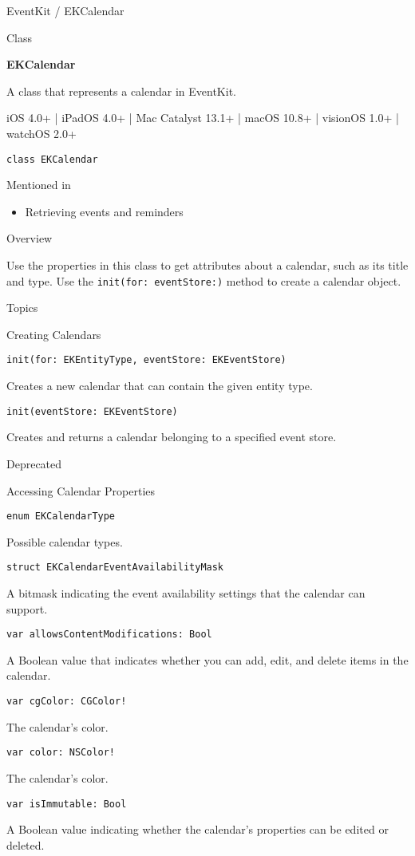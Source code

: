 \documentclass{article}
\title{}
\author{}
\date{}
\begin{document}
EventKit / EKCalendar

Class

\textbf{EKCalendar}

A class that represents a calendar in EventKit.

iOS 4.0+ | iPadOS 4.0+ | Mac Catalyst 13.1+ | macOS 10.8+ | visionOS 1.0+ | watchOS 2.0+

\texttt{class EKCalendar}

Mentioned in

\begin{itemize}
    \item Retrieving events and reminders
\end{itemize}

Overview

Use the properties in this class to get attributes about a calendar, such as its title and type. Use the \texttt{init(for: eventStore:)} method to create a calendar object.

Topics

Creating Calendars

\texttt{init(for: EKEntityType, eventStore: EKEventStore)}

Creates a new calendar that can contain the given entity type.

\texttt{init(eventStore: EKEventStore)}

Creates and returns a calendar belonging to a specified event store.

Deprecated

Accessing Calendar Properties

\texttt{enum EKCalendarType}

Possible calendar types.

\texttt{struct EKCalendarEventAvailabilityMask}

A bitmask indicating the event availability settings that the calendar can support.

\texttt{var allowsContentModifications: Bool}

A Boolean value that indicates whether you can add, edit, and delete items in the calendar.

\texttt{var cgColor: CGColor!}

The calendar's color.

\texttt{var color: NSColor!}

The calendar's color.

\texttt{var isImmutable: Bool}

A Boolean value indicating whether the calendar's properties can be edited or deleted.
\end{document}
